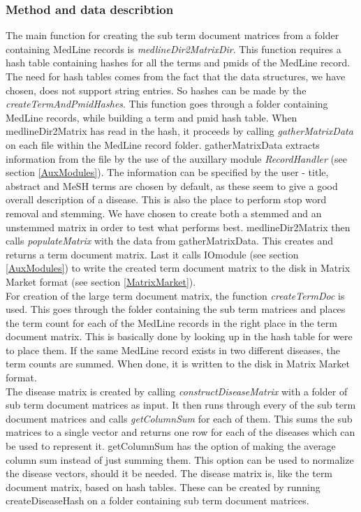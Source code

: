 \subsubsection{Method and data describtion}
The main function for creating the sub term document matrices from a
folder containing MedLine records is
\textit{medlineDir2MatrixDir}. This function requires a hash table
containing hashes for all the terms and pmids of the MedLine
record. The need for hash tables comes from the fact that the data
structures, we have chosen, does not support string entries. So hashes
can be made by the \textit{createTermAndPmidHashes}. This function
goes through a folder containing MedLine records, while building a
term and pmid hash table. When medlineDir2Matrix has read in the hash,
it proceeds by calling \textit{gatherMatrixData} on each file within
the MedLine record folder. gatherMatrixData extracts information from
the file by the use of the auxillary module \textit{RecordHandler} (see section
\ref{AuxModules}). The information can be specified by the user -
title, abstract and MeSH terms are chosen by default, as these seem to
give a good overall description of a disease. This is also the place
to perform stop word removal and stemming. We have chosen to create
both a stemmed and an unstemmed matrix in order to test what performs
best. medlineDir2Matrix then calls \textit{populateMatrix} with the
data from gatherMatrixData. This creates and returns a term document
matrix. Last it calls IOmodule (see section \ref{AuxModules}) to write
the created term document matrix to the disk in Matrix Market format
(see section \ref{MatrixMarket}).\\

For creation of the large term document matrix, the function
\textit{createTermDoc} is used. This goes through the folder containing
the sub term matrices and places the term count for each of the
MedLine records in the right place in the term document matrix. This
is basically done by looking up in the hash table for were to place
them. If the same MedLine record exists in two different diseases, the
term counts are summed. When done, it is written to the disk in Matrix
Market format.\\

The disease matrix is created by calling
\textit{constructDiseaseMatrix} with a folder of sub term document
matrices as input. It then runs through every of the sub term document
matrices and calls \textit{getColumnSum} for each of them. This sums
the sub matrices to a single vector and returns one row for each of
the diseases which can be used to represent it. getColumnSum has the
option of making the average column sum instead of just summing
them. This option can be used to normalize the disease vectors, should
it be needed. The disease matrix is, like the term document matrix,
based on hash tables. These can be created by running
createDiseaseHash on a folder containing sub term document matrices.\\

